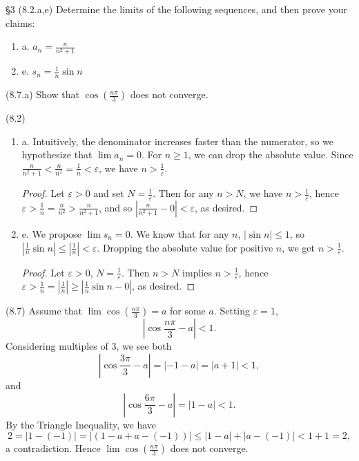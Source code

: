 \documentclass{homework}
\begin{document}
\begin{problem}{\S 3}
  (8.2.a,e) Determine the limits of the following sequences, and then prove your claims:
  \begin{enumerate}[label={}]
    \item a. $a_n=\frac{n}{n^2+1}$
    \item e. $s_n=\frac{1}{n}\sin{n}$
  \end{enumerate}
  (8.7.a) Show that $\cos{\left( \frac{n\pi}{3} \right) }$ does not converge.
\end{problem}

\begin{solution}
  (8.2)
  \begin{enumerate}[label={}]
    \item a. Intuitively, the denominator increases faster than the numerator, so we hypothesize
      that $\lim{a_n}=0$. For $n\ge 1$, we can drop the absolute value. Since
      $\frac{n}{n^2+1}<\frac{n}{n^2}=\frac{1}{n}<\varepsilon$, we have $n>\frac{1}{\varepsilon}$.
      \begin{proof}[Proof]
        Let $\varepsilon>0$ and set $N=\frac{1}{\varepsilon}$. Then for any $n>N$, we have
        $n>\frac{1}{\varepsilon}$, hence $\varepsilon>\frac{1}{n}=\frac{n}{n^2}>\frac{n}{n^2+1}$,
        and so $\left| \frac{n}{n^2+1}-0 \right| <\varepsilon$, as desired.
      \end{proof}
      
    \item e. We propose $\lim{s_n}=0$. We know that for any $n$, $\left| \sin{n} \right| \le 1$, so
      $\left| \frac{1}{n}\sin{n} \right| \le \left| \frac{1}{n} \right| <\varepsilon$. Dropping the
      absolute value for positive $n$, we get $n>\frac{1}{\varepsilon}$.
      \begin{proof}[Proof]
        Let $ \varepsilon>0$, $N=\frac{1}{\varepsilon}$. Then $n>N$ implies
        $n>\frac{1}{\varepsilon} $, hence $\varepsilon>\frac{1}{n}=\left| \frac{1}{n} \right| \ge
        \left| \frac{1}{n}\sin{n}-0 \right| $, as desired.
      \end{proof}
      
  \end{enumerate}

  (8.7) Assume that $\lim{\cos{(\frac{n\pi}{3})}}=a$ for some $a$. Setting $\varepsilon=1$, \[
    \left| \cos{\frac{n\pi}{3}}-a \right| <1
  .\]  Considering multiples of $3$, we see both \[
    \left| \cos{\frac{3\pi}{3}}-a \right| =\left| -1-a \right|=\left| a+1 \right|  <1
  ,\] and \[
    \left| \cos{\frac{6\pi}{3}}-a \right| =\left| 1-a \right| <1
  .\] 
  By the Triangle Inequality, we have \[
    2=\left| 1-(-1) \right| = \left| (1-a+a-(-1)) \right| \le \left| 1-a \right| +\left| a-(-1)
    \right| <1+1=2
  ,\] a contradiction. Hence $\lim{\cos{(\frac{n\pi}{3})}}$ does not converge.
\end{solution}
\end{document}
